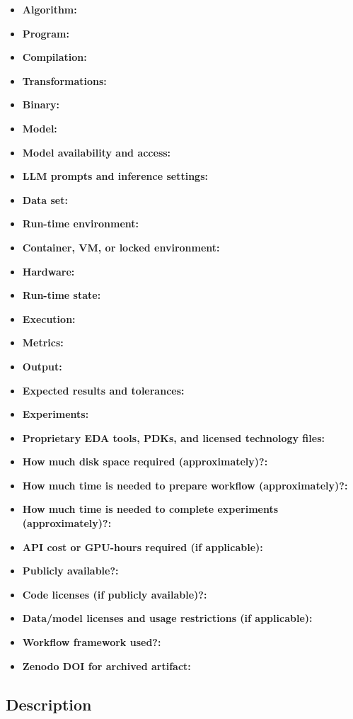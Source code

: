 \documentclass{sigplanconf}
\begin{document}
{\small
\begin{itemize}
  \item {\bf Algorithm: }
  \item {\bf Program: }
  \item {\bf Compilation: }
  \item {\bf Transformations: }
  \item {\bf Binary: }
  \item {\bf Model: }
  \item {\bf Model availability and access: }
  \item {\bf LLM prompts and inference settings: }
  \item {\bf Data set: }
  \item {\bf Run-time environment: }
  \item {\bf Container, VM, or locked environment: }
  \item {\bf Hardware: }
  \item {\bf Run-time state: }
  \item {\bf Execution: }
  \item {\bf Metrics: }
  \item {\bf Output: }
  \item {\bf Expected results and tolerances: }
  \item {\bf Experiments: }
  \item {\bf Proprietary EDA tools, PDKs, and licensed technology files: }
  \item {\bf How much disk space required (approximately)?: }
  \item {\bf How much time is needed to prepare workflow (approximately)?: }
  \item {\bf How much time is needed to complete experiments (approximately)?: }
  \item {\bf API cost or GPU-hours required (if applicable): }
  \item {\bf Publicly available?: }
  \item {\bf Code licenses (if publicly available)?: }
  \item {\bf Data/model licenses and usage restrictions (if applicable): }
  \item {\bf Workflow framework used?: }
  \item {\bf Zenodo DOI for archived artifact: }
\end{itemize}
}

\subsection{Description}
\end{document}
